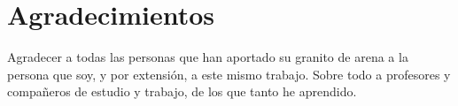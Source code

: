 
\chapter*{Agradecimientos}

Agradecer a todas las personas que han aportado su granito de arena a la persona que soy, y por extensión, a este mismo trabajo. Sobre todo a profesores y compañeros de estudio y trabajo, de los que tanto he aprendido.











